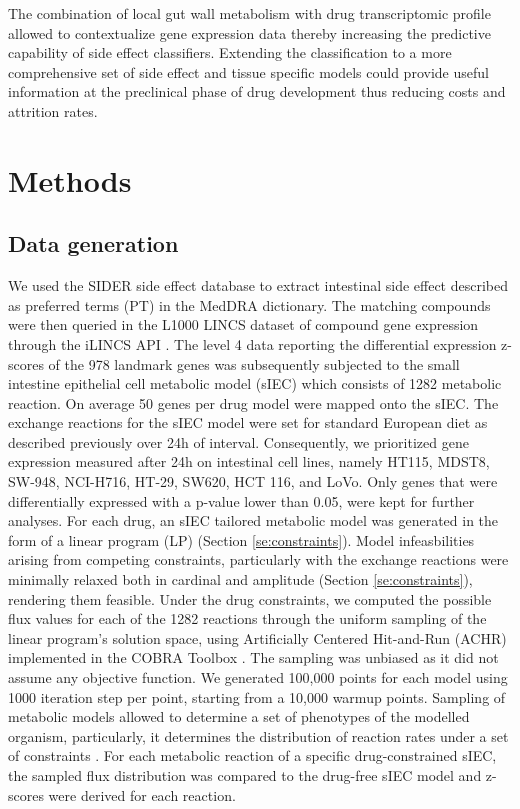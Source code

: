 The combination of local gut wall metabolism \cite{sahoo2013predicting} with drug transcriptomic profile allowed to contextualize gene expression data thereby increasing the predictive capability of side effect classifiers. Extending the classification to a more comprehensive set of side effect and tissue specific models could provide useful information at the preclinical phase of drug development thus reducing costs and attrition rates.

\section{Methods}
\subsection{Data generation}
We used the SIDER \cite{campillos2008drug,kuhn2010side} side effect database to extract intestinal side effect described as preferred terms (PT) in the MedDRA dictionary. The matching compounds were then queried in the L1000 LINCS dataset of compound gene expression\cite{subramanian2017next,lamb2006connectivity} through the iLINCS API \cite{keenan2017library}.  The level 4 data reporting the differential expression z-scores of the 978 landmark genes was subsequently subjected to the small intestine epithelial cell metabolic model (sIEC) \cite{sahoo2013predicting} which consists of 1282 metabolic reaction. On average 50 genes per drug model were mapped onto the sIEC. The exchange reactions for the sIEC model were set for standard European diet as described previously \cite{sahoo2013predicting} over 24h of interval. Consequently, we prioritized gene expression measured after 24h on intestinal cell lines, namely HT115, MDST8, SW-948, NCI-H716, HT-29, SW620, HCT 116, and LoVo. Only genes that were differentially expressed with a p-value lower than 0.05, were kept for further analyses. For each drug, an sIEC tailored metabolic model was generated in the form of a linear program (LP) (Section \ref{se:constraints}). Model infeasbilities arising from competing constraints, particularly with the exchange reactions were minimally relaxed both in cardinal and amplitude (Section \ref{se:constraints}), rendering them feasible. Under the drug constraints, we computed the possible flux values for each of the 1282 reactions through the uniform sampling of the linear program's solution space, using Artificially Centered Hit-and-Run (ACHR) implemented in the COBRA Toolbox \cite{heirendt2017creation}. The sampling was unbiased as it did not assume any objective function. We generated 100,000 points for each model using 1000 iteration step per point, starting from a 10,000 warmup points. Sampling of metabolic models allowed to determine a set of phenotypes of the modelled organism, particularly, it determines the distribution of reaction rates under a set of constraints \cite{bordel2010sampling}. For each metabolic reaction of a specific drug-constrained sIEC, the sampled flux distribution was compared to the drug-free sIEC model and z-scores were derived for each reaction.
